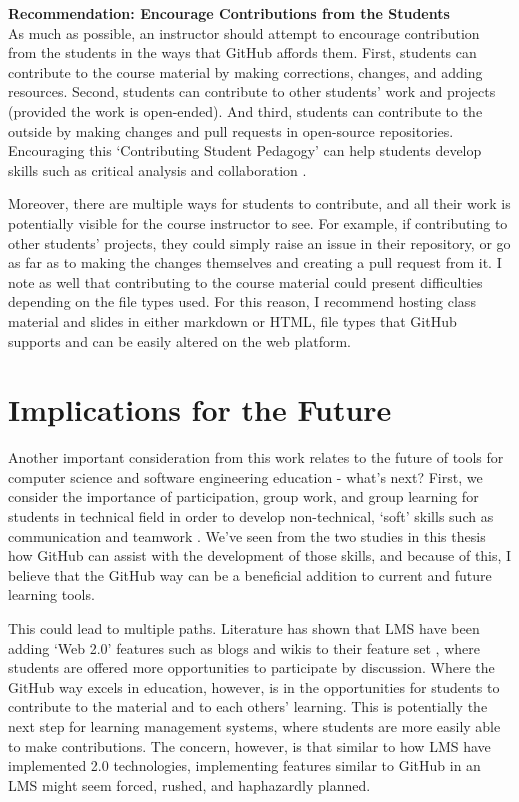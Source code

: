 \textbf{Recommendation: Encourage Contributions from the Students} \\
As much as possible, an instructor should attempt to encourage contribution from the students in the ways that GitHub affords them. First, students can contribute to the course material by making corrections, changes, and adding resources. Second, students can contribute to other students' work and projects (provided the work is open-ended). And third, students can contribute to the outside by making changes and pull requests in open-source repositories. Encouraging this `Contributing Student Pedagogy' can help students develop skills such as critical analysis and collaboration \cite{falkner2012supporting}.

Moreover, there are multiple ways for students to contribute, and all their work is potentially visible for the course instructor to see. For example, if contributing to other students' projects, they could simply raise an issue in their repository, or go as far as to making the changes themselves and creating a pull request from it. I note as well that contributing to the course material could present difficulties depending on the file types used. For this reason, I recommend hosting class material and slides in either markdown or HTML, file types that GitHub supports and can be easily altered on the web platform.

\section{Implications for the Future}
Another important consideration from this work relates to the future of tools for computer science and software engineering education - what's next? First, we consider the importance of participation, group work, and group learning for students in technical field in order to develop non-technical, `soft' skills such as communication and teamwork \cite{jazayeri2004education}. We've seen from the two studies in this thesis how GitHub can assist with the development of those skills, and because of this, I believe that the GitHub way can be a beneficial addition to current and future learning tools.

This could lead to multiple paths. Literature has shown that LMS have been adding `Web 2.0' features such as blogs and wikis to their feature set \cite{downes2005feature}, where students are offered more opportunities to participate by discussion. Where the GitHub way excels in education, however, is in the opportunities for students to contribute to the material and to each others' learning. This is potentially the next step for learning management systems, where students are more easily able to make contributions. The concern, however, is that similar to how LMS have implemented 2.0 technologies, implementing features similar to GitHub in an LMS might seem forced, rushed, and haphazardly planned.

